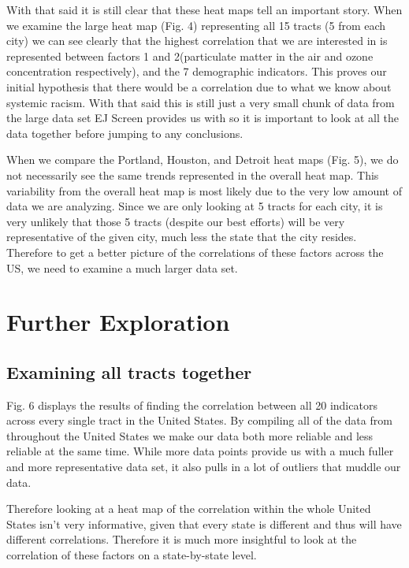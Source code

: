 \documentclass[letterpaper, 10 pt, conference]{ieeeconf}  %
\begin{document}
With that said it is still clear that these heat maps tell an important story. When we examine the large heat map (Fig. 4) representing all 15 tracts (5 from each city) we can see clearly that the highest correlation that we are interested in is represented between factors 1 and 2(particulate matter in the air and ozone concentration respectively), and the 7 demographic indicators. This proves our initial hypothesis that there would be a correlation due to what we know about systemic racism. With that said this is still just a very small chunk of data from the large data set EJ Screen provides us with so it is important to look at all the data together before jumping to any conclusions. \par

When we compare the Portland, Houston, and Detroit heat maps (Fig. 5), we do not necessarily see the same trends represented in the overall heat map. This variability from the overall heat map is most likely due to the very low amount of data we are analyzing. Since we are only looking at 5 tracts for each city, it is very unlikely that those 5 tracts (despite our best efforts) will be very representative of the given city, much less the state that the city resides. Therefore to get a better picture of the correlations of these factors across the US, we need to examine a much larger data set. \par




\section{Further Exploration}

\subsection{Examining all tracts together}

Fig. 6 displays the results of finding the correlation between all 20 indicators across every single tract in the United States. By compiling all of the data from throughout the United States we make our data both more reliable and less reliable at the same time. While more data points provide us with a much fuller and more representative data set, it also pulls in a lot of outliers that muddle our data. \par
Therefore looking at a heat map of the correlation within the whole United States isn't very informative, given that every state is different and thus will have different correlations. Therefore it is much more insightful to look at the correlation of these factors on a state-by-state level.\par 
\end{document}

